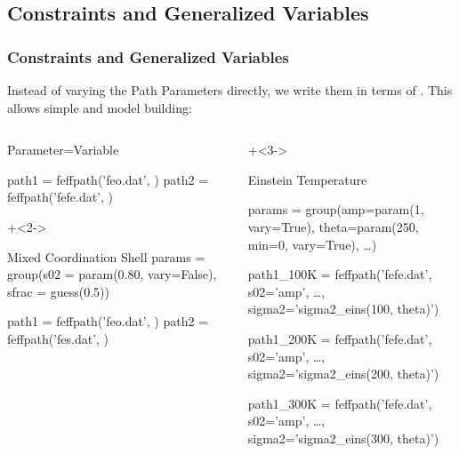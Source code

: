 \subsection{Constraints and Generalized Variables}
\begin{frame}[fragile] \frametitle{Constraints and Generalized Variables}

  Instead of varying the Path Parameters directly, we write them in terms of
  {}.  This allows simple {} and model building:

\begin{columns}
  \begin{column}{53mm}

  \begin{CodeBlock}{50mm}{Parameter=Variable}
{}
{}

path1  = feffpath('feo.dat', {})
path2  = feffpath('fefe.dat', {})
  \end{CodeBlock}
  \hspace{1mm}   \vmm

  \onslide+<2->
  \begin{CodeBlock}{50mm}{Mixed Coordination Shell}
{}
params = group(s02   = param(0.80, vary=False),
               sfrac = guess(0.5))

path1 = feffpath('feo.dat', {})
path2 = feffpath('fes.dat', {})
  \end{CodeBlock}

  \vmm

  \end{column}
  \begin{column}{57mm}
    \onslide+<3->
  \begin{CodeBlock}{55mm}{Einstein Temperature }
{}

params = group(amp=param(1, vary=True),
               theta=param(250, min=0, vary=True), \ldots)

path1_100K = feffpath('fefe.dat', s02='amp', \ldots,
                      sigma2='sigma2_eins(100, theta)')

path1_200K = feffpath('fefe.dat', s02='amp', \ldots,
                      sigma2='sigma2_eins(200, theta)')

path1_300K = feffpath('fefe.dat', s02='amp', \ldots,
                      sigma2='sigma2_eins(300, theta)')


\end{CodeBlock}
\end{column}
\end{columns}
\end{frame}
